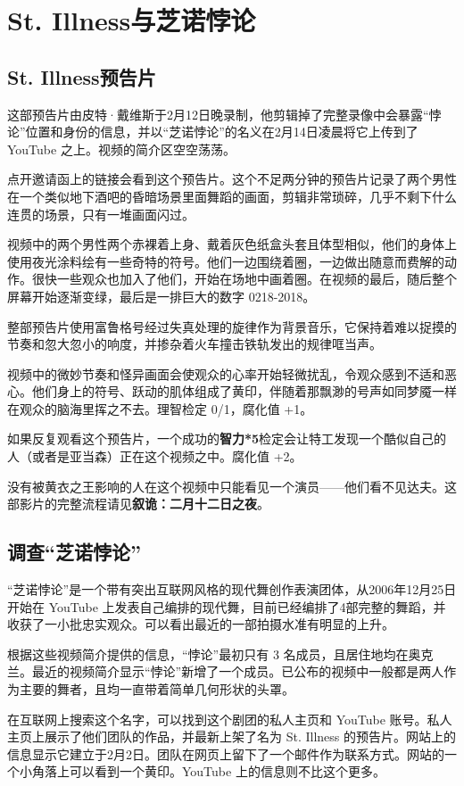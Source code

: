 \section{St. Illness与芝诺悖论}

\subsection{St. Illness预告片}
这部预告片由皮特·戴维斯于2月12日晚录制，他剪辑掉了完整录像中会暴露“悖论”位置和身份的信息，并以“芝诺悖论”的名义在2月14日凌晨将它上传到了 YouTube 之上。视频的简介区空空荡荡。

点开邀请函上的链接会看到这个预告片。这个不足两分钟的预告片记录了两个男性在一个类似地下酒吧的昏暗场景里面舞蹈的画面，剪辑非常琐碎，几乎不剩下什么连贯的场景，只有一堆画面闪过。

视频中的两个男性两个赤裸着上身、戴着灰色纸盒头套且体型相似，他们的身体上使用夜光涂料绘有一些奇特的符号。他们一边围绕着圈，一边做出随意而费解的动作。很快一些观众也加入了他们，开始在场地中画着圈。在视频的最后，随后整个屏幕开始逐渐变绿，最后是一排巨大的数字 0218-2018。

整部预告片使用富鲁格号经过失真处理的旋律作为背景音乐，它保持着难以捉摸的节奏和忽大忽小的响度，并掺杂着火车撞击铁轨发出的规律哐当声。

视频中的微妙节奏和怪异画面会使观众的心率开始轻微扰乱，令观众感到不适和恶心。他们身上的符号、跃动的肌体组成了黄印，伴随着那飘渺的号声如同梦魇一样在观众的脑海里挥之不去。理智检定 0/1，腐化值 +1。

如果反复观看这个预告片，一个成功的\textbf{智力*5}检定会让特工发现一个酷似自己的人（或者是亚当森）正在这个视频之中。腐化值 +2。

没有被黄衣之王影响的人在这个视频中只能看见一个演员——他们看不见达夫。这部影片的完整流程请见\textbf{叙诡：二月十二日之夜}。

\subsection{调查“芝诺悖论”}
“芝诺悖论”是一个带有突出互联网风格的现代舞创作表演团体，从2006年12月25日开始在 YouTube 上发表自己编排的现代舞，目前已经编排了4部完整的舞蹈，并收获了一小批忠实观众。可以看出最近的一部拍摄水准有明显的上升。

根据这些视频简介提供的信息，“悖论”最初只有 3 名成员，且居住地均在奥克兰。最近的视频简介显示“悖论”新增了一个成员。已公布的视频中一般都是两人作为主要的舞者，且均一直带着简单几何形状的头罩。

在互联网上搜索这个名字，可以找到这个剧团的私人主页和 YouTube 账号。私人主页上展示了他们团队的作品，并最新上架了名为 St. Illness 的预告片。网站上的信息显示它建立于2月2日。团队在网页上留下了一个邮件作为联系方式。网站的一个小角落上可以看到一个黄印。YouTube 上的信息则不比这个更多。

